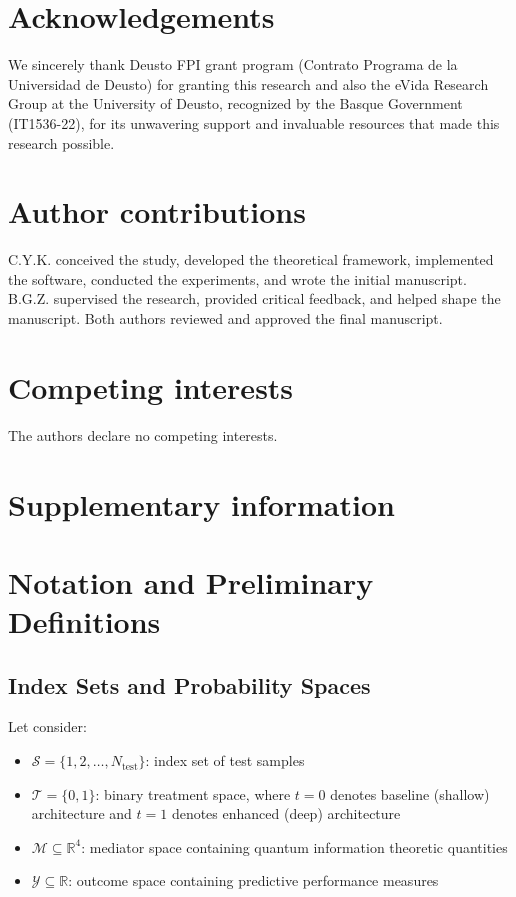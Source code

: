 \documentclass[
    reprint,
    amsmath, amssymb,
    aps,
    floatfix,
    nofootinbib
]{revtex4-1}
\begin{document}
\section*{Acknowledgements}
We sincerely thank Deusto FPI grant program (Contrato Programa de la Universidad de Deusto) for granting this research and also the eVida Research Group at the University of Deusto, recognized by the Basque Government (IT1536-22), for its unwavering support and invaluable resources that made this research possible.

\section{Author contributions}
C.Y.K. conceived the study, developed the theoretical framework, implemented the software, conducted the experiments, and wrote the initial manuscript. B.G.Z. supervised the research, provided critical feedback, and helped shape the manuscript. Both authors reviewed and approved the final manuscript.

\section*{Competing interests}
The authors declare no competing interests.



\clearpage
\onecolumngrid          %





\appendix

\section*{Supplementary information}

\noindent
\section{Notation and Preliminary Definitions}

\subsection{Index Sets and Probability Spaces}

Let consider:
\begin{itemize}
    \item $\mathcal{S} = \{1, 2, \ldots, N_{\text{test}}\}$: index set of test samples
    \item $\mathcal{T} = \{0, 1\}$: binary treatment space, where $t=0$ denotes baseline (shallow) architecture and $t=1$ denotes enhanced (deep) architecture
    \item $\mathcal{M} \subseteq \mathbb{R}^4$: mediator space containing quantum information theoretic quantities
    \item $\mathcal{Y} \subseteq \mathbb{R}$: outcome space containing predictive performance measures
\end{itemize}
\end{document}
